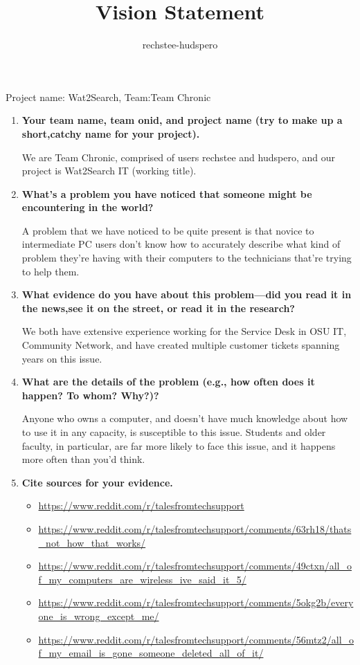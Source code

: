 \documentclass[12pt, letterpaper]{article}
\title{Vision Statement}
\author{rechstee-hudspero}
\begin{document}
\maketitle Project name: Wat2Search, Team:Team Chronic
\begin{enumerate}
	\item \textbf{Your team name, team onid, and project name (try to make up a short,catchy name for your project).}
	
	We are Team Chronic, comprised of users rechstee and hudspero, and our project is Wat2Search IT (working title).
	
	\item \textbf{What’s a problem you have noticed that someone might be encountering in the world?}
	
	A problem that we have noticed to be quite present is that novice to intermediate PC users don’t know how to accurately describe what kind of problem they’re having with their computers to the technicians that’re trying to help them.
	
	\item \textbf{What evidence do you have about this problem—did you read it in the news,see it on the street, or read it in the research?}
	
	We both have extensive experience working for the Service Desk in OSU IT, Community Network, and have created multiple customer tickets spanning years on this issue. 
	
	\item \textbf{What are   the   details   of   the problem (e.g., how often does it happen? To whom? Why?)?}
	
	Anyone who owns a computer, and doesn’t have much knowledge about how to use it in any capacity, is susceptible to this issue. Students and older faculty, in particular, are far more likely to face this issue, and it happens more often than you’d think.
	
	\item \textbf{Cite sources for your evidence.}
	
	\begin{itemize}
	\item \url{https://www.reddit.com/r/talesfromtechsupport}
	\item \url{https://www.reddit.com/r/talesfromtechsupport/comments/63rh18/thats_not_how_that_works/}
	\item \url{https://www.reddit.com/r/talesfromtechsupport/comments/49ctxn/all_of_my_computers_are_wireless_ive_said_it_5/}
	\item \url{https://www.reddit.com/r/talesfromtechsupport/comments/5okg2b/everyone_is_wrong_except_me/}
	\item \url{https://www.reddit.com/r/talesfromtechsupport/comments/56mtz2/all_of_my_email_is_gone_someone_deleted_all_of_it/}
	\end{itemize}
	

\end{enumerate}
\end{document}

